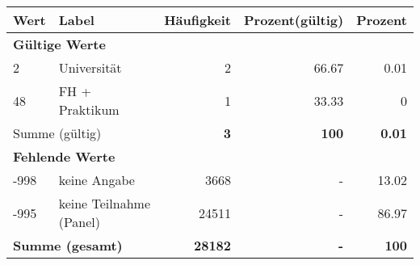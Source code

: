      \begin{longtable}{lXrrr}
     \toprule
     \textbf{Wert} & \textbf{Label} & \textbf{Häufigkeit} & \textbf{Prozent(gültig)} & \textbf{Prozent} \\
     \endhead
     \midrule
     \multicolumn{5}{l}{\textbf{Gültige Werte}}\\

     2 &
     \multicolumn{1}{X}{ Universität   } &


       \num{2} &
       \num[round-mode=places,round-precision=2]{66.67} &
         \num[round-mode=places,round-precision=2]{0.01} \\

     48 &
     \multicolumn{1}{X}{ FH + Praktikum   } &


       \num{1} &
       \num[round-mode=places,round-precision=2]{33.33} &
         \num[round-mode=places,round-precision=2]{0} \\
     \midrule
     \multicolumn{2}{l}{Summe (gültig)} &
       \textbf{\num{3}} &
     \textbf{100} &
       \textbf{\num[round-mode=places,round-precision=2]{0.01}} \\
     \multicolumn{5}{l}{\textbf{Fehlende Werte}}\\
       -998 &
       keine Angabe &
         \num{3668} &
        - &
         \num[round-mode=places,round-precision=2]{13.02} \\
       -995 &
       keine Teilnahme (Panel) &
         \num{24511} &
        - &
         \num[round-mode=places,round-precision=2]{86.97} \\
     \midrule
     \multicolumn{2}{l}{\textbf{Summe (gesamt)}} &
          \textbf{\num{28182}} &
        \textbf{-} &
        \textbf{100} \\
     \bottomrule
     \end{longtable}
     
